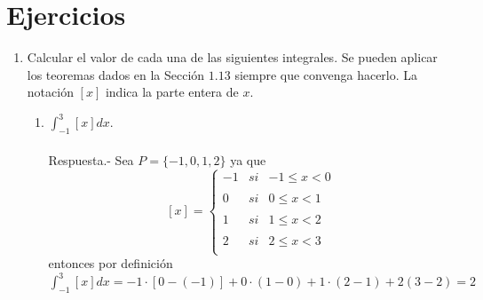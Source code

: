 \setcounter{section}{14}
\section{Ejercicios}

\begin{enumerate}

    \item Calcular el valor de cada una de las siguientes integrales. Se pueden aplicar los teoremas dados en la Sección $1.13$ siempre que convenga hacerlo. La notación $[x]$ indica la parte entera de $x$.

    \begin{enumerate}[\bfseries (a)]
	
	\item $\displaystyle\int_{-1}^{3} [x] dx.$\\\\ 
	    Respuesta.-\; Sea $P=\lbrace -1,0,1,2 \rbrace$ ya que 
	    $$[x] = \left\{ \begin{array}{rcl}
		-1&si& -1\leq x <0\\
		\\ 0&si& 0\leq x < 1 \\
		\\ 1&si& 1\leq x < 2 \\
		\\ 2&si& 2\leq x < 3 \\
		\end{array}\right.$$
	    entonces por definición $\displaystyle\int_{-1}^{3} [x] dx = -1\cdot [0-(-1)] + 0\cdot (1-0) + 1\cdot (2-1) + 2(3-2) = 2$\\\\


\end{enumerate}
\end{enumerate}
